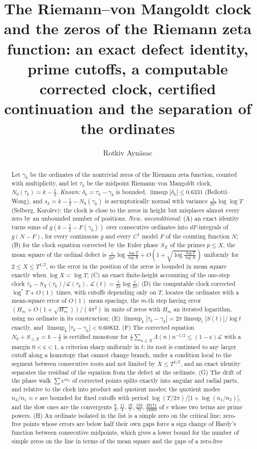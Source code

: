\documentclass[preprint,12pt]{elsarticle}
\numberwithin{equation}{section}
\theoremstyle{plain}
\theoremstyle{definition}
\theoremstyle{remark}
\newcommand{\NO}{N_0}
\newcommand{\lL}{\mathcal L}
\begin{document}
\begin{frontmatter}
\title{The Riemann--von Mangoldt clock and the zeros of the Riemann zeta function: an exact defect identity, prime cutoffs, a computable corrected clock, certified continuation and the separation of the ordinates}
\author{Rotkiv Ayn\"asac}

\begin{abstract}
Let $\gamma_k$ be the ordinates of the nontrivial zeros of the Riemann zeta function, counted with multiplicity, and let $\tau_k$ be the midpoint Riemann--von Mangoldt clock, $\NO(\tau_k)=k-\frac12$. \emph{Known:} $\delta_k=\tau_k-\gamma_k$ is bounded, $\limsup|\delta_k|\le0.6331$ (Bellotti--Wong), and $s_k=k-\frac12-\NO(\gamma_k)$ is asymptotically normal with variance $\frac1{2\pi^2}\log\log T$ (Selberg, Korolev): the clock is close to the zeros in height but misplaces almost every zero by an unbounded number of positions. \emph{New, unconditional:} (A) an exact identity turns sums of $g(k-\frac12-F(\gamma_k))$ over consecutive ordinates into $dF$-integrals of $g(N-F)$, for every continuous $g$ and every $C^1$ model $F$ of the counting function $N$; (B) for the clock equation corrected by the Euler phase $S_X$ of the primes $p\le X$, the mean square of the ordinal defect is $\frac1{2\pi^2}\log\frac{\log T}{\log X}+O(1+\sqrt{\log\frac{\log T}{\log X}})$ uniformly for $2\le X\le T^{1/2}$, so the error in the position of the zeros is bounded in mean square exactly when $\log X\asymp\log T$; (C) an exact finite-height accounting of the one-step clock $\tau_k-S_X(\tau_k)/\lL(\tau_k)$, $\lL(t)=\frac1{2\pi}\log\frac t{2\pi}$; (D) the computable clock corrected $\log^*T+O(1)$ times, with cutoffs depending only on $T$, locates the ordinates with a mean-square error of $O(1)$ mean spacings, the $m$-th step having error $(H_m+O(1+\sqrt{H_m}))/(4\pi^2)$ in units of zeros with $H_m$ an iterated logarithm, using no ordinate in its construction; (E) $\limsup_k|\tau_k-\gamma_k|=2\pi\limsup_t|S(t)|/\log t$ exactly, and $\limsup_k|\tau_k-\gamma_k|<0.60832$. (F) The corrected equation $\NO+S_{\le X}=k-\frac12$ is certified monotone for $\frac1\pi\sum_{n\le X}\Lambda(n)n^{-1/2}\le(1-\mathsf c)\lL$ with a margin $0<\mathsf c<1$, a criterion sharp uniformly in $t$; its root is continued to any larger cutoff along a homotopy that cannot change branch, under a condition local to the segment between consecutive roots and not limited by $X\le T^{1/2}$, and an exact identity separates the residual of the equation from the defect at the ordinate. (G) The drift of the phase walk $\sum e^{ix_k}$ of corrected points splits exactly into angular and radial parts, and relative to the clock into product and quotient modes; the quotient modes $n_2/n_1\approx e$ are bounded for fixed cutoffs with period $\log(T/2\pi)/|1+\log(n_1/n_2)|$, and the slow ones are the convergents $\frac83,\frac{11}4,\frac{19}7,\frac{193}{71},\frac{49171}{18089}$ of $e$ whose two terms are prime powers. (H) An ordinate isolated in the list is a simple zero on the critical line; zero-free points whose errors are below half their own gaps force a sign change of Hardy's function between consecutive midpoints, which gives a lower bound for the number of simple zeros on the line in terms of the mean square and the gaps of a zero-free 
\end{abstract}
\end{frontmatter}
\end{document}
